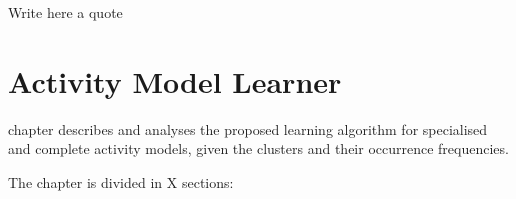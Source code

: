 

\begin{savequote}[50mm]
Write here a quote
\end{savequote}


\chapter{Activity Model Learner}
\label{cha:learner}

\ifpdf
    \graphicspath{{5_activity_model_learner/figures/PDF/}{5_activity_model_learner/figures/PNG/}{5_activity_model_learner/figures/}}
\else
    \graphicspath{{5_activity_model_learner/figures/EPS/}{5_activity_model_learner/figures/}}
\fi

 chapter describes and analyses the proposed learning algorithm for specialised and complete activity models, given the clusters and their occurrence frequencies.

The chapter is divided in X sections: